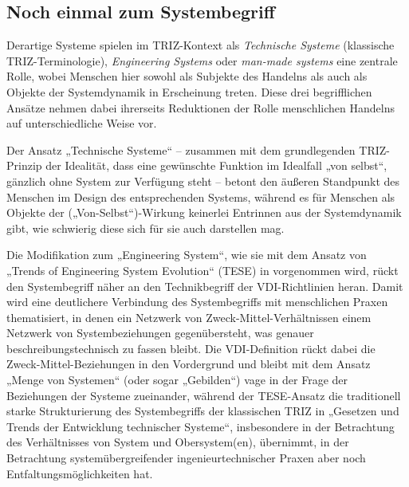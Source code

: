 \documentclass[11pt,a4paper]{article}
\begin{document}
\subsection{Noch einmal zum Systembegriff}

Derartige Systeme spielen im TRIZ-Kontext als \emph{Technische Systeme}
(klassische TRIZ-Termi\-nologie), \emph{Engineering Systems} oder
\emph{man-made systems} \cite{Souchkov2014} eine zentrale Rolle, wobei
Menschen hier sowohl als Subjekte des Handelns als auch als Objekte der
Systemdynamik in Erscheinung treten. Diese drei begriff\-lichen Ansätze nehmen
dabei ihrerseits Reduktionen der Rolle menschlichen Handelns auf
unterschiedliche Weise vor.

Der Ansatz „Technische Systeme“ -- zusammen mit dem grundlegenden TRIZ-Prinzip
der Idealität, dass eine gewünschte Funktion im Idealfall „von selbst“,
gänzlich ohne System zur Verfügung steht -- betont den äußeren Standpunkt des
Menschen im Design des entsprechenden Systems, während es für Menschen als
Objekte der („Von-Selbst“)-Wirkung keinerlei Entrinnen aus der Systemdynamik
gibt, wie schwierig diese sich für sie auch darstellen mag.

Die Modifikation zum „Engineering System“, wie sie mit dem Ansatz von „Trends
of Engineering System Evolution“ (TESE) in \cite{TESE2018} vorgenommen wird,
rückt den Systembegriff näher an den Technikbegriff der VDI-Richtlinien heran.
Damit wird eine deutlichere Verbindung des Systembegriffs mit menschlichen
Praxen thematisiert, in denen ein Netzwerk von Zweck-Mittel-Verhältnissen
einem Netzwerk von Systembeziehungen gegenübersteht, was genauer
beschreibungstechnisch zu fassen bleibt. Die VDI-Definition rückt dabei die
Zweck-Mittel-Beziehungen in den Vordergrund und bleibt mit dem Ansatz „Menge
von Systemen“ (oder sogar „Gebilden“) vage in der Frage der Beziehungen der
Systeme zueinander, während der TESE-Ansatz die traditionell starke
Strukturierung des Systembegriffs der klassischen TRIZ in „Gesetzen und Trends
der Entwicklung technischer Systeme“, insbesondere in der Betrachtung des
Verhältnisses von System und Obersystem(en), übernimmt, in der Betrachtung
systemübergreifender ingenieurtechnischer Praxen aber noch
Entfaltungsmöglichkeiten hat.
\end{document}
